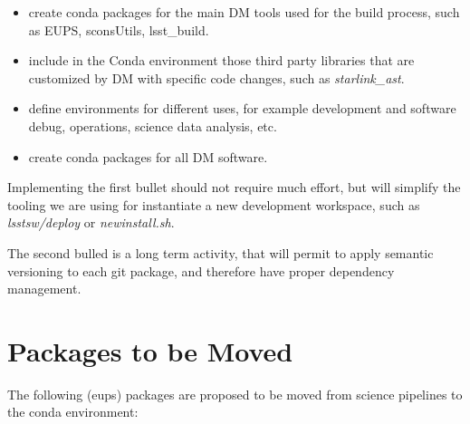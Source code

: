 \begin{itemize}
\item create conda packages for the main DM tools used for the build process, such as EUPS, sconsUtils, lsst\_build. 
\item include in the Conda environment those third party libraries that are customized by DM with specific code changes, such as \textit{starlink\_ast}.
\item define environments for different uses, for example development and software debug, operations, science data analysis, etc.
\item create conda packages for all DM software.
\end{itemize}

Implementing the first bullet should not require much effort, but will simplify the tooling we are using for instantiate a new development workspace, such as \textit{lsstsw/deploy} or \textit{newinstall.sh}.

The second bulled is a long term activity, that will permit to apply semantic versioning to each git package, and therefore have proper dependency management.


\newpage
\appendix
\section{Packages to be Moved} \label{sec:tomove}

The following (eups) packages are proposed to be moved from science pipelines to the conda environment:

